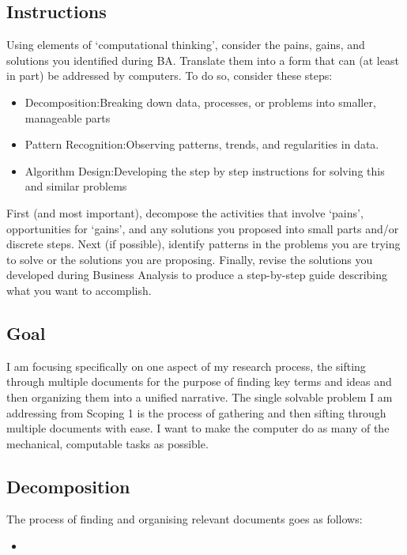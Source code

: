 \documentclass{article}
\begin{document}
\subsection{Instructions}
Using elements of ‘computational thinking’, consider the pains, gains, and solutions you identified during BA. Translate them into a form that can (at least in part) be addressed by computers. To do so, consider these steps:
\begin{itemize}
    \item Decomposition:Breaking down data, processes, or problems into smaller, manageable parts
    \item Pattern Recognition:Observing patterns, trends, and regularities in data.
    \item Algorithm Design:Developing the step by step instructions for solving this and similar problems
\end{itemize}
First (and most important), decompose the activities that involve ‘pains’, opportunities for ‘gains’, and any solutions you proposed into small parts and/or discrete steps. Next (if possible), identify patterns in the problems you are trying to solve or the solutions you are proposing. Finally, revise the solutions you developed during Business Analysis to produce a step-by-step guide describing what you want to accomplish.

\subsection{Goal}

I am focusing specifically on one aspect of my research process, the sifting through multiple documents for the purpose of finding key terms and ideas and then organizing them into a unified narrative. The single solvable problem I am addressing from Scoping 1 is the process of gathering and then sifting through multiple documents with ease. I want to make the computer do as many of the mechanical, computable tasks as possible.

\subsection{Decomposition}

The process of finding and organising relevant documents goes as follows:

\begin{itemize}

    \item
\end{itemize}
\end{document}
